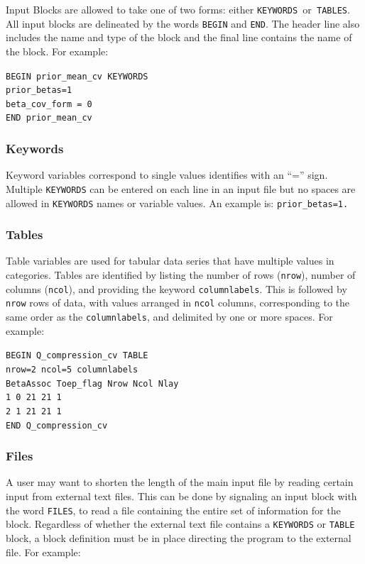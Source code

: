 \documentclass[11pt,oneside,onecolumn]{usgsreport}
\begin{document}
\begin{appendix}
\begin{bibunit}
Input Blocks are allowed to take one of two forms: either \texttt{KEYWORDS
}or\texttt{ TABLES}. All input blocks are delineated by the words
\texttt{BEGIN} and \texttt{END}. The header line also includes the
name and type of the block and the final line contains the name of
the block. For example:

\texttt{BEGIN prior\_mean\_cv KEYWORDS}~\\
\texttt{prior\_betas=1}~\\
\texttt{beta\_cov\_form = 0}~\\
\texttt{END prior\_mean\_cv}


\subsubsection{Keywords}

Keyword variables correspond to single values identifies with an ``=''
sign. Multiple \texttt{KEYWORDS} can be entered on each line in an
input file but no spaces are allowed in \texttt{KEYWORDS} names or
variable values. An example is: \texttt{prior\_betas=1.}


\subsubsection{Tables}

Table variables are used for tabular data series that have multiple
values in categories. Tables are identified by listing the number
of rows (\texttt{nrow}), number of columns (\texttt{ncol}), and providing
the keyword \texttt{columnlabels}. This is followed by \texttt{nrow}
rows of data, with values arranged in \texttt{ncol} columns, corresponding
to the same order as the \texttt{columnlabels}, and delimited by one
or more spaces. For example:

\texttt{BEGIN Q\_compression\_cv TABLE}~\\
\texttt{nrow=2 ncol=5 columnlabels }~\\
\texttt{BetaAssoc Toep\_flag Nrow Ncol Nlay }~\\
\texttt{1 0 21 21 1 }~\\
\texttt{2 1 21 21 1 }~\\
\texttt{END Q\_compression\_cv}


\subsubsection{Files }

A user may want to shorten the length of the main input file by reading
certain input from external text files. This can be done by signaling
an input block with the word \texttt{FILES}, to read a file containing
the entire set of information for the block. Regardless of whether
the external text file contains a \texttt{KEYWORDS} or \texttt{TABLE}
block, a block definition must be in place directing the program to
the external file. For example:


\end{bibunit}
\end{appendix}
\end{document}

